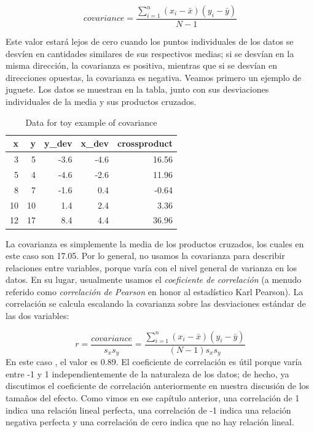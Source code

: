 \documentclass[
  12pt,
]{book}
\begin{document}
\[
covariance = \frac{\sum_{i=1}^n (x_i - \bar{x})(y_i - \bar{y})}{N - 1}
\]

Este valor estará lejos de cero cuando los puntos individuales de los datos se desvíen en cantidades similares de sus respectivos medias; si se desvían en la misma dirección, la covarianza es positiva, mientras que si se desvían en direcciones opuestas, la covarianza es negativa. Veamos primero un ejemplo de juguete. Los datos se muestran en la tabla, junto con sus desviaciones individuales de la media y sus productos cruzados.

\begin{table}

\caption{\label{tab:unnamed-chunk-85}Data for toy example of covariance}
\centering
\begin{tabular}[t]{r|r|r|r|r}
\hline
x & y & y\_dev & x\_dev & crossproduct\\
\hline
3 & 5 & -3.6 & -4.6 & 16.56\\
\hline
5 & 4 & -4.6 & -2.6 & 11.96\\
\hline
8 & 7 & -1.6 & 0.4 & -0.64\\
\hline
10 & 10 & 1.4 & 2.4 & 3.36\\
\hline
12 & 17 & 8.4 & 4.4 & 36.96\\
\hline
\end{tabular}
\end{table}

La covarianza es simplemente la media de los productos cruzados, los cuales en este caso son 17.05. Por lo general, no usamos la covarianza para describir relaciones entre variables, porque varía con el nivel general de varianza en los datos. En su lugar, usualmente usamos el \emph{coeficiente de correlación} (a menudo referido como \emph{correlación de Pearson} en honor al estadístico Karl Pearson). La correlación se calcula escalando la covarianza sobre las desviaciones estándar de las dos variables:

\[
r = \frac{covariance}{s_xs_y} = \frac{\sum_{i=1}^n (x_i - \bar{x})(y_i - \bar{y})}{(N - 1)s_x s_y}
\]
En este caso , el valor es 0.89. El coeficiente de correlación es útil porque varía entre -1 y 1 independientemente de la naturaleza de los datos; de hecho, ya discutimos el coeficiente de correlación anteriormente en nuestra discusión de los tamaños del efecto. Como vimos en ese capítulo anterior, una correlación de 1 indica una relación lineal perfecta, una correlación de -1 indica una relación negativa perfecta y una correlación de cero indica que no hay relación lineal.
\end{document}

